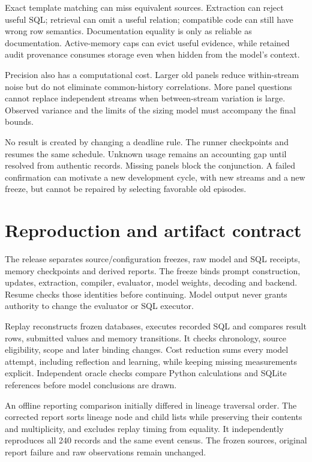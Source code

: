 \documentclass[10pt,twocolumn]{article}
\begin{document}
Exact template matching can miss equivalent sources. Extraction can reject
useful SQL; retrieval can omit a useful relation; compatible code can still have
wrong row semantics. Documentation equality is only as reliable as documentation.
Active-memory caps can evict useful evidence, while retained audit provenance
consumes storage even when hidden from the model's context.

Precision also has a computational cost. Larger old panels reduce within-stream
noise but do not eliminate common-history correlations. More panel questions
cannot replace independent streams when between-stream variation is large.
Observed variance and the limits of the sizing model must accompany the final
bounds.

No result is created by changing a deadline rule. The runner checkpoints and
resumes the same schedule. Unknown usage remains an accounting gap until
resolved from authentic records. Missing panels block the conjunction. A failed
confirmation can motivate a new development cycle, with new streams and a new
freeze, but cannot be repaired by selecting favorable old episodes.

\section{Reproduction and artifact contract}
The release separates source/configuration freezes, raw model and SQL receipts,
memory checkpoints and derived reports. The freeze binds prompt construction,
updates, extraction, compiler, evaluator, model weights, decoding and backend.
Resume checks those identities before continuing. Model output never grants
authority to change the evaluator or SQL executor.

Replay reconstructs frozen databases, executes recorded SQL and compares result
rows, submitted values and memory transitions. It checks chronology, source
eligibility, scope and later binding changes. Cost reduction sums every model
attempt, including reflection and learning, while keeping missing measurements
explicit. Independent oracle checks compare Python calculations and SQLite
references before model conclusions are drawn.

An offline reporting comparison initially differed in lineage traversal order.
The corrected report sorts lineage node and child lists while preserving their
contents and multiplicity, and excludes replay timing from equality. It
independently reproduces all 240 records and the same event census. The frozen
sources, original report failure and raw observations remain unchanged.
\end{document}
